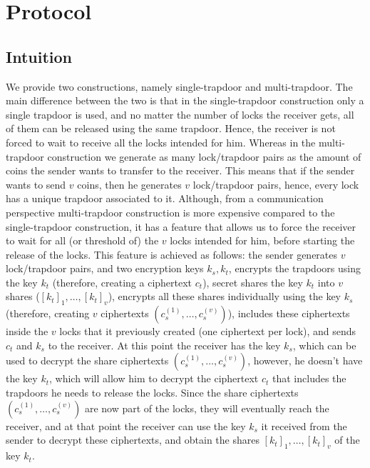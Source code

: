\section{Protocol}



\subsection{Intuition}

We provide two constructions, namely single-trapdoor and multi-trapdoor. The main difference between the 
two is that in the single-trapdoor construction only a single trapdoor is used, and no matter the number of 
locks the receiver gets, all of them can be released using the same trapdoor. Hence, the receiver is not 
forced to wait to receive all the locks intended for him. Whereas in the multi-trapdoor construction we 
generate as many lock/trapdoor pairs as the amount of coins the sender wants to transfer to the receiver. 
This means that if the sender wants to send $v$ coins, then he generates $v$ lock/trapdoor pairs, hence, 
every lock has a unique trapdoor associated to it. Although, from a communication perspective multi-trapdoor 
construction is more expensive compared to the single-trapdoor construction, it has a feature that allows us 
to force the receiver to wait for all (or threshold of) the $v$ locks intended for him, before starting the 
release of the locks. This feature is achieved as follows: the sender generates $v$ lock/trapdoor pairs, and
two encryption keys $k_s, k_t$, encrypts the trapdoors using the key $k_t$ (therefore, creating a ciphertext 
$c_t$), secret shares the key $k_t$ into $v$ shares ($[k_t]_1,\ldots,[k_t]_v$), 
encrypts all these shares individually using the key $k_s$ (therefore, creating $v$ ciphertexts $(c_s^{(1)},
\ldots,c_s^{(v)})$), includes these ciphertexts inside the $v$ locks that it previously created (one 
ciphertext per lock), and sends $c_t$ and $k_s$ to the receiver. At this point the receiver has the key $k_s$, 
which can be used to decrypt the share ciphertexts $(c_s^{(1)},\ldots,c_s^{(v)})$, however, he doesn't have 
the key $k_t$, which will allow him to decrypt the ciphertext $c_t$ that includes the trapdoors he needs 
to release the locks. Since the share ciphertexts $(c_s^{(1)},\ldots,c_s^{(v)})$ are now part of the locks, 
they will eventually reach the receiver, and at that point the receiver can use the key $k_s$ it received 
from the sender to decrypt these ciphertexts, and obtain the shares $[k_t]_1,\ldots,[k_t]_v$ of the key $k_t$. 
